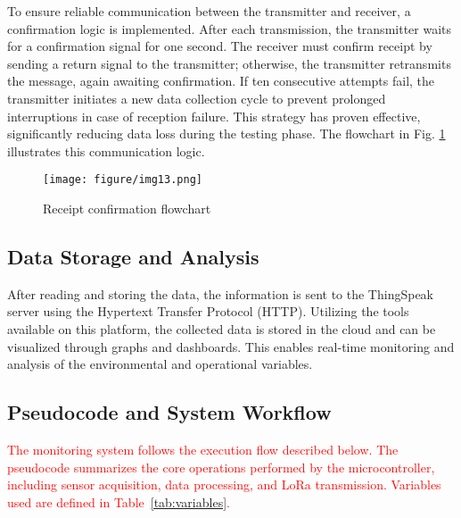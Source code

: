 To ensure reliable communication between the transmitter and receiver, a confirmation logic is implemented. After each transmission, the transmitter waits for a confirmation signal for one second. The receiver must confirm receipt by sending a return signal to the transmitter; otherwise, the transmitter retransmits the message, again awaiting confirmation. If ten consecutive attempts fail, the transmitter initiates a new data collection cycle to prevent prolonged interruptions in case of reception failure. This strategy has proven effective, significantly reducing data loss during the testing phase. The flowchart in Fig. \ref{fig:fluxograma} illustrates this communication logic.



\begin{figure}[h]
    \centering
    \texttt{[image: figure/img13.png]}
    \caption{Receipt confirmation flowchart}
    \label{fig:fluxograma}
\end{figure}


\subsection{Data Storage and Analysis}
After reading and storing the data, the information is sent to the ThingSpeak server using the Hypertext Transfer Protocol (HTTP). Utilizing the tools available on this platform, the collected data is stored in the cloud and can be visualized through graphs and dashboards. This enables real-time monitoring and analysis of the environmental and operational variables.

\subsection{Pseudocode and System Workflow}
\label{sec:pseudocode}
\textcolor{red}{
The monitoring system follows the execution flow described below. The pseudocode summarizes the core operations performed by the microcontroller, including sensor acquisition, data processing, and LoRa transmission. Variables used are defined in Table~\ref{tab:variables}.
}



